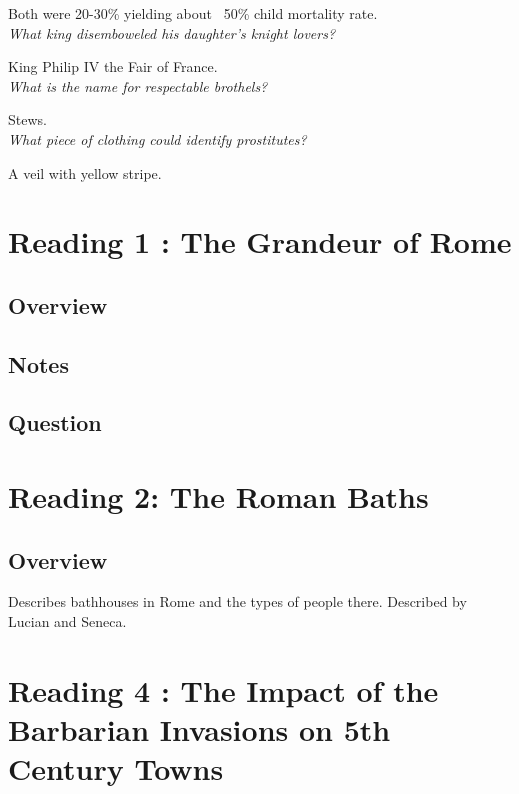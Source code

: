 \documentclass[12pt]{article}
\begin{document}
Both were 20-30\% yielding about ~50\% child mortality rate.\\

\textit{What king disemboweled his daughter's knight lovers?}

King Philip IV the Fair of France.\\

\textit{What is the name for respectable brothels?}

Stews.\\

\textit{What piece of clothing could identify prostitutes?}

A veil with yellow stripe.\\








\section*{Reading 1 : The Grandeur of Rome}

\subsection*{Overview}

\subsection*{Notes}

\subsection*{Question}

\section*{Reading 2: The Roman Baths}

\subsection*{Overview}

Describes bathhouses in Rome and the types of people there. Described by Lucian and Seneca.

\section*{Reading 4 : The Impact of the Barbarian Invasions on 5th Century Towns}
\end{document}
